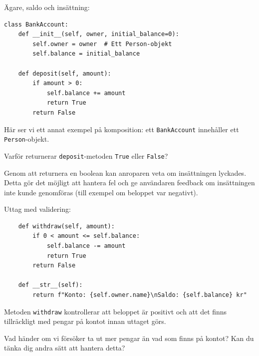 \begin{frame}[fragile]
  \begin{example}[Bankkontoklass]
    Ägare, saldo och insättning:
    \begin{verbatim}
class BankAccount:
    def __init__(self, owner, initial_balance=0):
        self.owner = owner  # Ett Person-objekt
        self.balance = initial_balance
    
    def deposit(self, amount):
        if amount > 0:
            self.balance += amount
            return True
        return False
    \end{verbatim}
  \end{example}
\end{frame}

Här ser vi ett annat exempel på komposition: ett \texttt{BankAccount} 
innehåller ett \texttt{Person}-objekt.

\begin{exercise}
  Varför returnerar \texttt{deposit}-metoden \texttt{True} 
  eller \texttt{False}?
\end{exercise}

Genom att returnera en boolean kan anroparen veta om insättningen lyckades. 
Detta gör det möjligt att hantera fel och ge användaren feedback om 
insättningen inte kunde genomföras (till exempel om beloppet var negativt).

\begin{frame}[fragile]
  \begin{example}
    Uttag med validering:
    \begin{verbatim}
    def withdraw(self, amount):
        if 0 < amount <= self.balance:
            self.balance -= amount
            return True
        return False
    
    def __str__(self):
        return f"Konto: {self.owner.name}\nSaldo: {self.balance} kr"
    \end{verbatim}
  \end{example}
\end{frame}

Metoden \texttt{withdraw} kontrollerar att beloppet är positivt 
och att det finns tillräckligt med pengar på kontot innan uttaget görs.

\begin{exercise}
  Vad händer om vi försöker ta ut mer pengar än vad som finns på kontot?
  Kan du tänka dig andra sätt att hantera detta?
\end{exercise}

